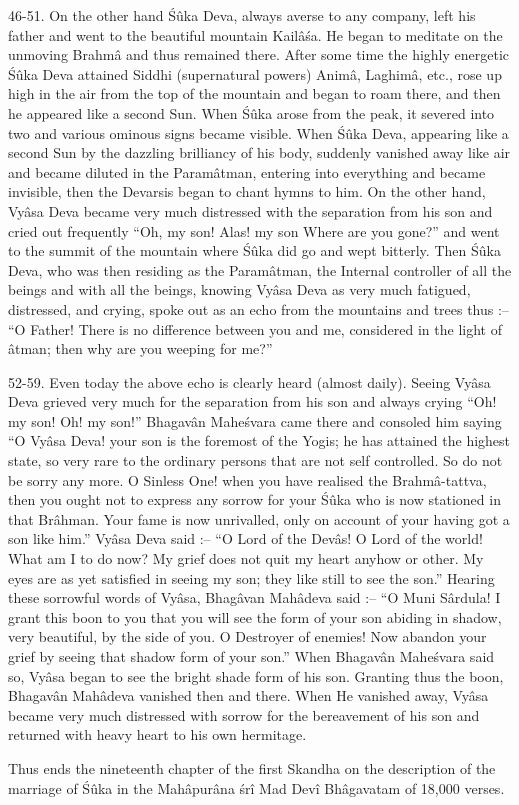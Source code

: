 46-51. On the other hand \'S\^uka Deva, always averse to any company, left his father and went to the beautiful mountain Kail\^a\'sa. He began to meditate on the unmoving Brahm\^a and thus remained there. After some time the highly energetic \'S\^uka Deva attained Siddhi (supernatural powers) Anim\^a, Laghim\^a, etc., rose up high in the air from the top of the mountain and began to roam there, and then he appeared like a second Sun. When \'S\^uka arose from the peak, it severed into two and various ominous signs became visible. When \'S\^uka Deva, appearing like a second Sun by the dazzling brilliancy of his body, suddenly vanished away like air and became diluted in the Param\^atman, entering into everything and became invisible, then the Devarsis began to chant hymns to him. On the other hand, Vy\^asa Deva became very much distressed with the separation from his son and cried out frequently ``Oh, my son! Alas! my son Where are you gone?'' and went to the summit of the mountain where \'S\^uka did go and wept bitterly. Then \'S\^uka Deva, who was then residing as the Param\^atman, the Internal controller of all the beings and with all the beings, knowing Vy\^asa Deva as very much fatigued, distressed, and crying, spoke out as an echo from the mountains and trees thus :-- ``O Father! There is no difference between you and me, considered in the light of \^atman; then why are you weeping for me?''

52-59. Even today the above echo is clearly heard (almost daily). Seeing Vy\^asa Deva grieved very much for the separation from his son and always crying ``Oh! my son! Oh! my son!'' Bhagav\^an Mahe\'svara came there and consoled him saying ``O Vy\^asa Deva! your son is the foremost of the Yogis; he has attained the highest state, so very rare to the ordinary persons that are not self controlled. So do not be sorry any more. O Sinless One! when you have realised the Brahm\^a-tattva, then you ought not to express any sorrow for your \'S\^uka who is now stationed in that Br\^ahman. Your fame is now unrivalled, only on account of your having got a son like him.'' Vy\^asa Deva said :-- ``O Lord of the Dev\^as! O Lord of the world! What am I to do now? My grief does not quit my heart anyhow or other. My eyes are as yet satisfied in seeing my son; they like still to see the son.'' Hearing these sorrowful words of Vy\^asa, Bhag\^avan Mah\^adeva said :-- ``O Muni S\^ardula! I grant this boon to you that you will see the form of your son abiding in shadow, very beautiful, by the side of you. O Destroyer of enemies! Now abandon your grief by seeing that shadow form of your son.'' When Bhagav\^an Mahe\'svara said so, Vy\^asa began to see the bright shade form of his son. Granting thus the boon, Bhagav\^an Mah\^adeva vanished then and there. When He vanished away, Vy\^asa became very much distressed with sorrow for the bereavement of his son and returned with heavy heart to his own hermitage.

Thus ends the nineteenth chapter of the first Skandha on the description of the marriage of \'S\^uka in the Mah\^apur\^ana \'sr\^i Mad Dev\^i Bh\^agavatam of 18,000 verses.